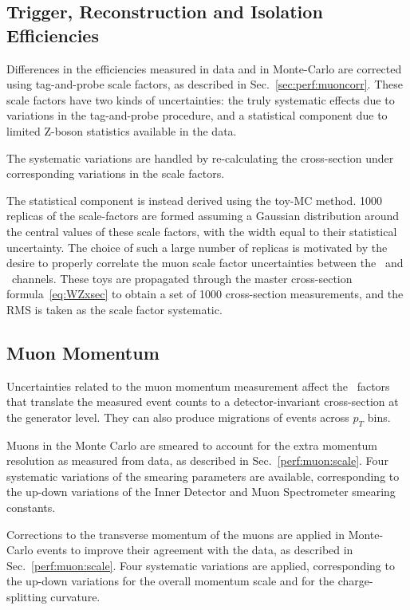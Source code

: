 \subsection{Trigger, Reconstruction and Isolation Efficiencies}
Differences in the efficiencies measured in data and in Monte-Carlo are corrected using tag-and-probe scale factors, as described in Sec.~\ref{sec:perf:muoncorr}. These scale factors have two kinds of uncertainties: the truly systematic effects due to variations in the tag-and-probe procedure, and a statistical component due to limited Z-boson statistics available in the data.

The systematic variations are handled by re-calculating the cross-section under corresponding variations in the scale factors.

The statistical component is instead derived using the toy-MC method. 1000 replicas of the scale-factors are formed assuming a Gaussian distribution around the central values of these scale factors, with the width equal to their statistical uncertainty. The choice of such a large number of replicas is motivated by the desire to properly correlate the muon scale factor uncertainties between the \Wmn\ and \Zmm\ channels. These toys are propagated through the master cross-section formula~\ref{eq:WZxsec} to obtain a set of 1000 cross-section measurements, and the RMS is taken as the scale factor systematic.

\subsection{Muon Momentum}
Uncertainties related to the muon momentum measurement affect the \C\ factors that translate the measured event counts to a detector-invariant cross-section at the generator level. They can also produce migrations of events across $p_{T}$ bins.

Muons in the Monte Carlo are smeared to account for the extra momentum resolution as measured from data, as described in Sec.~\ref{perf:muon:scale}. Four systematic variations of the smearing parameters are available, corresponding to the up-down variations of the Inner Detector and Muon Spectrometer smearing constants.

Corrections to the transverse momentum of the muons are applied in Monte-Carlo events to improve their agreement with the data, as described in Sec.~\ref{perf:muon:scale}. Four systematic variations are applied, corresponding to the up-down variations for the overall momentum scale and for the charge-splitting curvature.

